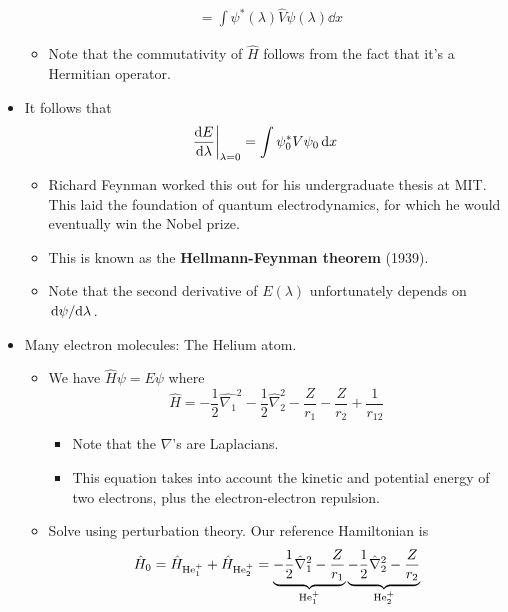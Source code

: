 \documentclass[../notes.tex]{subfiles}
\begin{document}
\begin{itemize}
\begin{align*}
        &= \int\psi^*(\lambda)\hat{V}\psi(\lambda)\dd{x}
    \end{align*}
    \endgroup
    \begin{itemize}
        \item Note that the commutativity of $\hat{H}$ follows from the fact that it's a Hermitian operator.
    \end{itemize}
    \item It follows that
    \begin{equation*}
        \dv{E}{\lambda}\bigg|_{\lambda=0} = \int\psi_0^*V\psi_0\dd{x}
    \end{equation*}
    \begin{itemize}
        \item Richard Feynman worked this out for his undergraduate thesis at MIT. This laid the foundation of quantum electrodynamics, for which he would eventually win the Nobel prize.
        \item This is known as the \textbf{Hellmann-Feynman theorem} (1939).
        \item Note that the second derivative of $E(\lambda)$ unfortunately depends on $\dv*{\psi}{\lambda}$.
    \end{itemize}
    \item Many electron molecules: The Helium atom.
    \begin{itemize}
        \item We have $\hat{H}\psi=E\psi$ where
        \begin{equation*}
            \hat{H} = -\frac{1}{2}\hat{\nabla_1}^2-\frac{1}{2}\hat{\nabla}_2^2-\frac{Z}{r_1}-\frac{Z}{r_2}+\frac{1}{r_{12}}
        \end{equation*}
        \begin{itemize}
            \item Note that the $\nabla$'s are Laplacians.
            \item This equation takes into account the kinetic and potential energy of two electrons, plus the electron-electron repulsion.
        \end{itemize}
        \item Solve using perturbation theory. Our reference Hamiltonian is
        \begin{equation*}
            \hat{H}_0 = \hat{H}_{\ce{He+}_1}+\hat{H}_{\ce{He+}_2} = \underbrace{-\frac{1}{2}\hat{\nabla}_1^2-\frac{Z}{r_1}}_{\ce{He+}_1}\underbrace{-\frac{1}{2}\hat{\nabla}_2^2-\frac{Z}{r_2}}_{\ce{He+}_2}
        \end{equation*}

\end{itemize}
\end{itemize}
\end{document}

